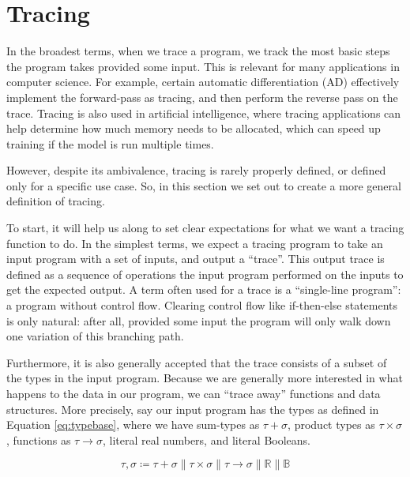 \section{Tracing} \label{sec:tracing}
    In the broadest terms, when we trace a program, we track the most basic steps the program takes provided some input.
    This is relevant for many applications in computer science.
    For example, certain automatic differentiation (AD) effectively implement the forward-pass as tracing, and then perform the reverse pass on the trace.
    Tracing is also used in artificial intelligence, where tracing applications can help determine how much memory needs to be allocated, which can speed up training if the model is run multiple times.

    However, despite its ambivalence, tracing is rarely properly defined, or defined only for a specific use case.
    So, in this section we set out to create a more general definition of tracing.
    
    To start, it will help us along to set clear expectations for what we want a tracing function to do.
    In the simplest terms, we expect a tracing program to take an input program with a set of inputs, and output a ``trace''.
    This output trace is defined as a sequence of operations the input program performed on the inputs to get the expected output.
    A term often used for a trace is a ``single-line program'': a program without control flow.
    Clearing control flow like if-then-else statements is only natural: after all, provided some input the program will only walk down one variation of this branching path.

    Furthermore, it is also generally accepted that the trace consists of a subset of the types in the input program.
    Because we are generally more interested in what happens to the data in our program, we can ``trace away'' functions and data structures.
    More precisely, say our input program has the types as defined in Equation \ref{eq:typebase}, where we have sum-types as $\tau+\sigma$, product types as $\tau\times\sigma$, functions as $\tau\to\sigma$, literal real numbers, and literal Booleans.

    \begin{equation}
        \label{eq:typebase}
        \tau,\sigma\coloneqq\tau+\sigma\|\tau\times\sigma\|\tau\to\sigma\|\mathbb{R}\|\mathbb{B}
    \end{equation}

